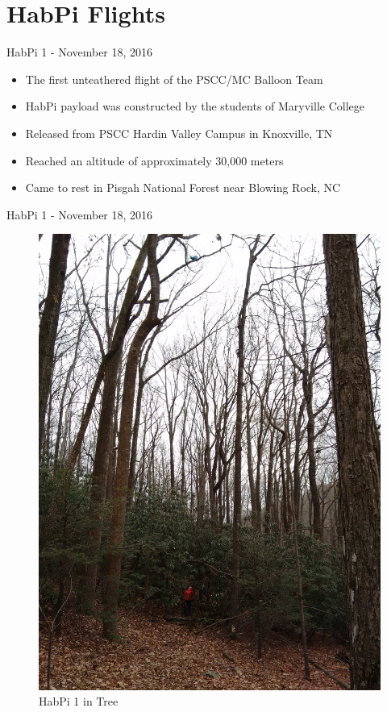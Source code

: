 \documentclass{beamer}
\begin{document}
\section{HabPi Flights}
\begin{frame}{HabPi 1 - November 18, 2016}
    \begin{itemize}[<+->]
        \item The first unteathered flight of the PSCC/MC Balloon
          Team
        \item HabPi payload was constructed by the students of
        Maryville College
        \item Released from PSCC Hardin Valley Campus in Knoxville, TN
        \item Reached an altitude of approximately 30,000 meters
        \item Came to rest in Pisgah National Forest near Blowing
           Rock, NC
    \end{itemize}
\end{frame}
\begin{frame}{HabPi 1 - November 18, 2016}
    \begin{figure}
        \centering
        \includegraphics[height=0.75\textheight]{images/HabPi1_1}
        \caption{HabPi 1 in Tree}
    \end{figure}
\end{frame}
\end{document}
